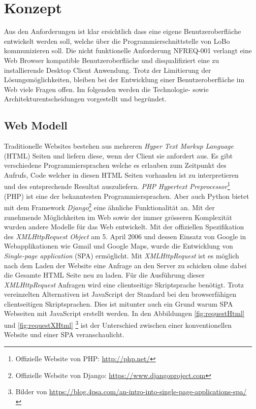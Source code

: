 \chapter{Konzept}
\label{sec:konzept}

Aus den Anforderungen ist klar ersichtlich dass eine eigene Benutzeroberfläche entwickelt werden soll, welche über die Programmierschnittstelle von LoBo kommunizieren soll. Die nicht funktionelle Anforderung NFREQ-001 verlangt eine Web Browser kompatible Benutzeroberfläche und disqualifiziert eine zu installierende Desktop Client Anwendung. Trotz der Limitierung der Lösungsmöglichkeiten, bleiben bei der Entwicklung einer Benutzeroberfläche im Web viele Fragen offen. Im folgenden werden die Technologie- sowie Architekturentscheidungen vorgestellt und begründet.

\section{Web Modell}
Traditionelle Websites bestehen aus mehreren \textit{Hyper Text Markup Language} (HTML) Seiten und liefern diese, wenn der Client sie anfordert aus. Es gibt verschiedene Programmiersprachen welche es erlauben zum Zeitpunkt des Aufrufs, Code welcher in diesen HTML Seiten vorhanden ist zu interpretieren und des entsprechende Resultat auszuliefern. \textit{PHP Hypertext Preprocessor}\footnote{Offizielle Website von PHP: \url{http://php.net/}} (PHP) ist eine der bekanntesten Programmiersprachen. Aber auch Python bietet mit dem Framework \textit{Django}\footnote{Offizielle Website von Django: \url{https://www.djangoproject.com}} eine ähnliche Funktionalität an. Mit der zunehmende Möglichkeiten im Web sowie der immer grösseren Komplexität wurden andere Modelle für das Web entwickelt. Mit der offiziellen Spezifikation des \textit{XMLHttpRequest Object} am 5. April 2006\citep[]{w3cXMLHttpRequest} und dessen Einsatz von Google in Webapplikationen wie Gmail und Google Maps, wurde die Entwicklung von \textit{Single-page application} (SPA) ermöglicht. Mit \textit{XMLHttpRequest} ist es möglich nach dem Laden der Website eine Anfrage an den Server zu schicken ohne dabei die Gesamte HTML Seite neu zu laden. Für die Ausführung dieser \textit{XMLHttpRequest} Anfragen wird eine clientseitige Skriptsprache benötigt. Trotz vereinzelten Alternativen ist JavaScript der Standard bei den browserfähigen clientseitigen Skriptsprachen. Dies ist mitunter auch ein Grund warum SPA Webseiten mit JavaScript erstellt werden. In den Abbildungen  \ref{fig:requestHtml} und \ref{fig:requestXHtml} \footnote{Bilder von \url{https://blog.4psa.com/an-intro-into-single-page-applications-spa/}} ist der Unterschied zwischen einer konventionellen Website und einer SPA veranschaulicht.

